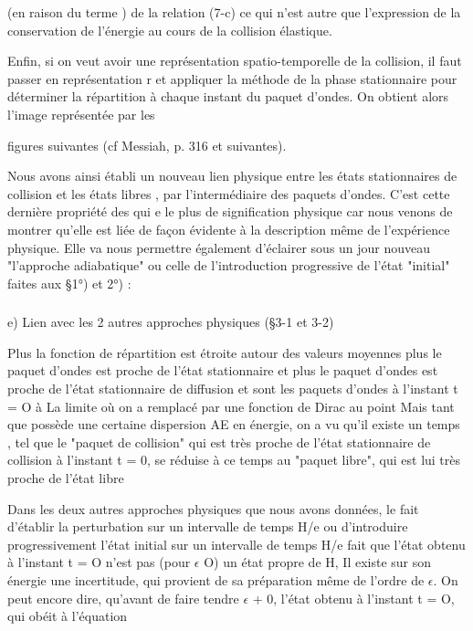 {{{%

(en raison du terme ) de la relation (7-c) ce qui n'est autre
que l'expression de la conservation de l'énergie au cours de la collision élastique.

Enfin, si on veut avoir une représentation spatio-temporelle
de la collision, il faut passer en représentation r et appliquer la méthode de la
phase stationnaire pour déterminer la répartition à chaque
instant du paquet d'ondes. On obtient alors l'image représentée par les

figures suivantes (cf Messiah, p. 316 et suivantes).


Nous avons ainsi établi un nouveau lien physique entre les
états stationnaires de collision  et les états libres  , par
l'intermédiaire des paquets d'ondes. C'est cette dernière propriété des
 qui e le plus de signification physique car nous venons de montrer
qu'elle est liée de façon évidente à la description même de l'expérience
physique. Elle va nous permettre également d'éclairer sous un jour nouveau
"l'approche adiabatique" ou celle de l'introduction progressive de l'état
"initial" faites aux \S 1°) et 2°) :

\subsubsection{}%
e) Lien avec les 2 autres approches physiques (\S 3-1 et 3-2)

Plus la fonction de répartition  est étroite autour
des valeurs moyennes  plus le paquet d'ondes  est proche
de l'état stationnaire  et plus le paquet d'ondes  est proche
de l'état stationnaire de diffusion  et  sont les
paquets d'ondes à l'instant t = O à La limite où on a remplacé 
par une fonction de Dirac au point  Mais tant que  possède
une certaine dispersion AE en énergie, on a vu qu'il existe un temps
, tel que le "paquet de collision" qui est très proche de l'état
stationnaire de collision à l'instant t = 0, se réduise à ce temps au "paquet libre",
qui est lui très proche de l'état libre 

Dans les deux autres approches physiques que nous avons données,
le fait d'établir la perturbation sur un intervalle de temps H/e ou d'introduire
progressivement l'état initial sur un intervalle de temps H/e
fait que l'état obtenu à l'instant t = O n'est pas (pour $\epsilon$  O) un état
propre de H, Il existe sur son énergie une incertitude, qui provient de sa
préparation même de l'ordre de $\epsilon$. On peut encore dire, qu'avant de faire
tendre $\epsilon$ + 0, l'état obtenu à l'instant t = O,  qui obéit à l'équation 

}}}
